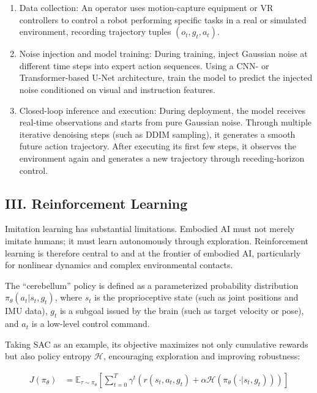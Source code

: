 \begin{enumerate}
\def\labelenumi{\arabic{enumi}.}
\tightlist
\item
  Data collection: An operator uses motion-capture equipment or VR controllers to control a robot performing specific tasks in a real or simulated environment, recording trajectory tuples \((o_t,g_t,a_t)\).
\item
  Noise injection and model training: During training, inject Gaussian noise at different time steps into expert action sequences. Using a CNN- or Transformer-based U-Net architecture, train the model to predict the injected noise conditioned on visual and instruction features.
\item
  Closed-loop inference and execution: During deployment, the model receives real-time observations and starts from pure Gaussian noise. Through multiple iterative denoising steps (such as DDIM sampling), it generates a smooth future action trajectory. After executing its first few steps, it observes the environment again and generates a new trajectory through receding-horizon control.
\end{enumerate}

\hypertarget{iii.-reinforcement-learning}{%
\subsection{III. Reinforcement Learning}\label{iii.-reinforcement-learning}}

Imitation learning has substantial limitations. Embodied AI must not merely imitate humans; it must learn autonomously through exploration. Reinforcement learning is therefore central to and at the frontier of embodied AI, particularly for nonlinear dynamics and complex environmental contacts.

The ``cerebellum'' policy is defined as a parameterized probability distribution \(\pi_\theta(a_t|s_t,g_t)\), where \(s_t\) is the proprioceptive state (such as joint positions and IMU data), \(g_t\) is a subgoal issued by the brain (such as target velocity or pose), and \(a_t\) is a low-level control command.

Taking SAC as an example, its objective maximizes not only cumulative rewards but also policy entropy \(\mathcal{H}\), encouraging exploration and improving robustness:

\[
\begin{aligned}
J(\pi_\theta)
&=
\mathbb{E}_{\tau\sim\pi_\theta}
\left[
\sum_{t=0}^{T}
\gamma^t
\left(
r(s_t,a_t,g_t)+
\alpha\mathcal{H}(\pi_\theta(\cdot|s_t,g_t))
\right)
\right]
\end{aligned}
\]

